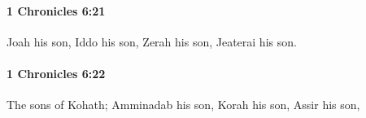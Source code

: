 		\paragraph{1 Chronicles 6:21} %
			\label{1CHRONICLES-6-21}

			Joah his son, Iddo his son, Zerah his son, Jeaterai his son.


		\paragraph{1 Chronicles 6:22} %
			\label{1CHRONICLES-6-22}

			The sons of Kohath; Amminadab his son, Korah his son, Assir his son,


